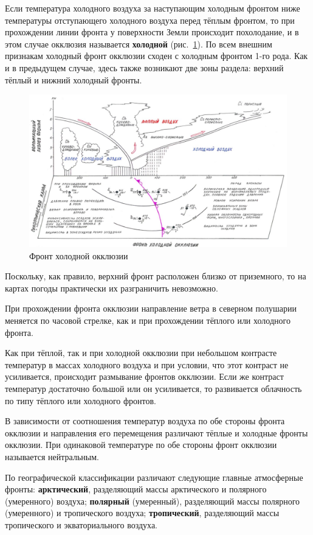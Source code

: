 \documentclass[a4paper, 12pt, twoside, draft, book, russian, fittopage, cyremdash, openright]{ncc}
\begin{document}
Если температура холодного воздуха за наступающим холодным фронтом
ниже температуры отступающего холодного воздуха перед тёплым фронтом,
то при прохождении линии фронта у поверхности Земли происходит
похолодание, и в этом случае окклюзия называется \textbf{холодной}
(рис.~\ref{fig:09_cold_ocl_front}). По всем внешним признакам холодный
фронт окклюзии сходен с холодным фронтом 1-го рода. Как и в предыдущем
случае, здесь также возникают две зоны раздела: верхний тёплый и
нижний холодный фронты.

\begin{figure}[htb]
   \centering
   \includegraphics[scale=0.7]{09_cold_ocl_front.pdf}
   \caption{Фронт холодной окклюзии}
   \label{fig:09_cold_ocl_front}
\end{figure}

Поскольку, как правило, верхний фронт расположен близко от приземного,
то на картах погоды практически их разграничить невозможно.

При прохождении фронта окклюзии направление ветра в северном полушарии
меняется по часовой стрелке, как и при прохождении тёплого или
холодного фронта.

Как при тёплой, так и при холодной окклюзии при небольшом контрасте
температур в массах холодного воздуха и при условии, что этот контраст
не усиливается, происходит размывание фронтов окклюзии. Если же
контраст температур достаточно большой или он усиливается, то
развивается облачность по типу тёплого или холодного фронтов.

В зависимости от соотношения температур воздуха по обе стороны фронта
окклюзии и направления его перемещения различают тёплые и холодные
фронты окклюзии. При одинаковой температуре по обе стороны фронт
окклюзии называется нейтральным.

По географической классификации различают следующие главные атмосферные фронты:
\textbf{арктический}, разделяющий массы арктического и полярного (умеренного) воздуха;
\textbf{полярный} (умеренный), разделяющий массы полярного (умеренного) и тропического воздуха;
\textbf{тропический}, разделяющий массы тропического и экваториального воздуха.
\end{document}
